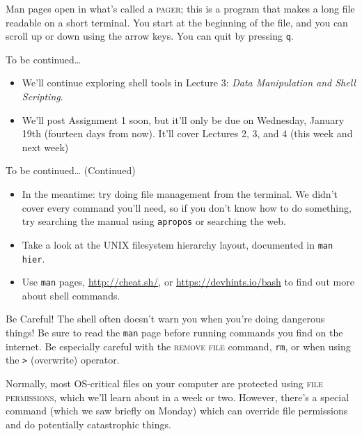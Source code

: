 Man pages open in what's called a \textsc{pager}; this is a program that makes
a long file readable on a short terminal.  You start at the beginning of the
file, and you can scroll up or down using the arrow keys.  You can quit by
pressing \texttt{q}.

\begin{frame}{To be continued\ldots}
  \begin{itemize}
    \item
      We'll continue exploring shell tools in Lecture 3: \textit{Data
      Manipulation and Shell Scripting}.
      \pause
    \item
      We'll post Assignment 1 soon, but it'll only be due on Wednesday, January
      19th (fourteen days from now).  It'll cover Lectures 2, 3, and 4 (this
      week and next week)
  \end{itemize}
\end{frame}

\begin{frame}{To be continued\ldots{ }(Continued)}
  \begin{itemize}
    \item
      In the meantime: try doing file management from the terminal.  We didn't
      cover every command you'll need, so if you don't know how to do
      something, try searching the manual using \texttt{apropos} or searching
      the web.
      \pause
    \item
      Take a look at the UNIX filesystem hierarchy layout, documented in
      \texttt{man hier}. 
    \item
      Use \texttt{man} pages, \url{http://cheat.sh/}, or
      \url{https://devhints.io/bash} to find out more about shell commands.
  \end{itemize}
  \pause
  \begin{alertblock}{Be Careful!}
    The shell often doesn't warn you when you're doing dangerous things!  Be
    sure to read the \texttt{man} page before running commands you find on the
    internet.  Be especially careful with the \textsc{remove file} command,
    \texttt{rm}, or when using the \texttt{>} (overwrite) operator.
  \end{alertblock}
\end{frame}

Normally, most OS-critical files on your computer are protected using
\textsc{file permissions}, which we'll learn about in a week or two.  However,
there's a special command (which we saw briefly on Monday) which can override
file permissions and do potentially catastrophic things.

